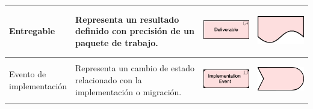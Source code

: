 \begin{longtable}{|p{0.15\linewidth}|p{0.45\linewidth}|p{0.2\linewidth} p{0.2\linewidth}|}
   Entregable
   &
   Representa un resultado definido con precisión de un paquete de trabajo. 
   &
\begin{center}
   \includegraphics[width=1\linewidth]{imgs/capa_migracion/2.pdf}
\end{center} &
\begin{center}
   \includegraphics[width=0.5\linewidth]{imgs/capa_migracion/a2.pdf}
\end{center}
   \\ \hline



   Evento de implementación 
   &
   Representa un cambio de estado relacionado con la implementación o migración. 
   &
\begin{center}
   \includegraphics[width=1\linewidth]{imgs/capa_migracion/3.pdf}
\end{center} &
\begin{center}
   \includegraphics[width=0.5\linewidth]{imgs/capa_migracion/a3.pdf}
\end{center}
   \\ \hline




\end{longtable}
